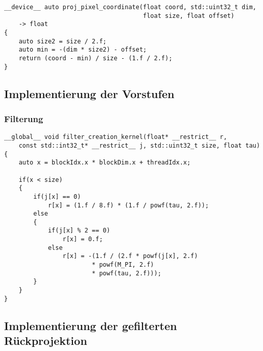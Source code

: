 \begin{code}
\begin{verbatim}
__device__ auto proj_pixel_coordinate(float coord, std::uint32_t dim,
                                      float size, float offset)
    -> float
{
    auto size2 = size / 2.f;
    auto min = -(dim * size2) - offset;
    return (coord - min) / size - (1.f / 2.f);
}
\end{verbatim}
\label{app:coord_det}
\end{code}

\subsection{Implementierung der Vorstufen}

\subsubsection{Filterung}

\begin{code}
\begin{verbatim}
__global__ void filter_creation_kernel(float* __restrict__ r,
    const std::int32_t* __restrict__ j, std::uint32_t size, float tau)
{
    auto x = blockIdx.x * blockDim.x + threadIdx.x;

    if(x < size)
    {
        if(j[x] == 0)
            r[x] = (1.f / 8.f) * (1.f / powf(tau, 2.f));
        else
        {
            if(j[x] % 2 == 0)
                r[x] = 0.f;
            else
                r[x] = -(1.f / (2.f * powf(j[x], 2.f)
                        * powf(M_PI, 2.f)
                        * powf(tau, 2.f)));
        }
    }
}
\end{verbatim}
\label{app:filter_gen}
\end{code}

\begin{code}
\label{app:filter_norm}
\end{code}

\subsection{Implementierung der gefilterten Rückprojektion}

